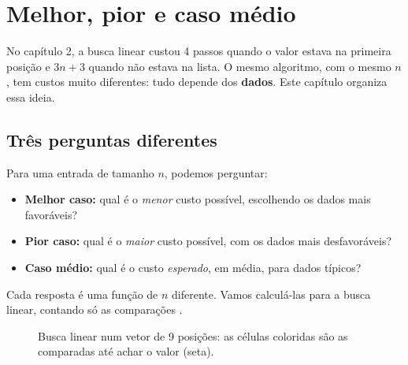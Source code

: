 \chapter{Melhor, pior e caso médio}\label{cap:08}

No capítulo 2, a busca linear custou 4 passos quando o valor estava na primeira posição e $3n + 3$
quando não estava na lista. O mesmo algoritmo, com o mesmo $n$, tem custos muito diferentes:
tudo depende dos \textbf{dados}. Este capítulo organiza essa ideia.

\section{Três perguntas diferentes}

Para uma entrada de tamanho $n$, podemos perguntar:

\begin{itemize}
  \item \textbf{Melhor caso:} qual é o \emph{menor} custo possível, escolhendo os dados mais
        favoráveis?
  \item \textbf{Pior caso:} qual é o \emph{maior} custo possível, com os dados mais desfavoráveis?
  \item \textbf{Caso médio:} qual é o custo \emph{esperado}, em média, para dados típicos?
\end{itemize}

Cada resposta é uma função de $n$ diferente. Vamos calculá-las para a busca linear, contando só
as comparações .

\begin{figure}[!htb]
\centering
{}
\caption{Busca linear num vetor de 9 posições: as células coloridas são as comparadas até achar o
valor (seta).}
\end{figure}

